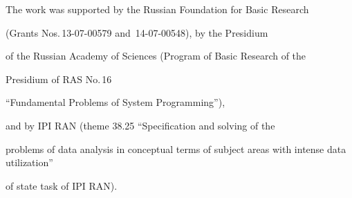 








\Ack

\noindent

The work was supported by the Russian Foundation for Basic Research

(Grants Nos.\,13-07-00579 and~14-07-00548), by the Presidium

of the Russian Academy of Sciences (Program of Basic Research of the

Presidium of RAS No.\,16

``Fundamental Problems of System Programming''),

and by IPI RAN (theme 38.25 ``Specification and solving of the

problems of data analysis in conceptual terms of subject areas with intense data utilization''

of state task of IPI RAN).





\vspace*{-2pt}







\renewcommand{\bibname}{\protect\rmfamily References}




